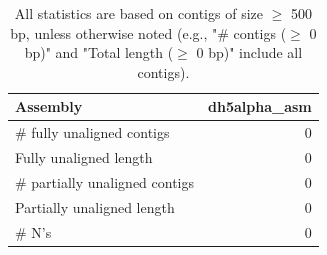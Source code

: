 \documentclass[12pt,a4paper]{article}
\begin{document}
\begin{table}[ht]
\begin{center}
\caption{All statistics are based on contigs of size $\geq$ 500 bp, unless otherwise noted (e.g., "\# contigs ($\geq$ 0 bp)" and "Total length ($\geq$ 0 bp)" include all contigs).}
\begin{tabular}{|l*{1}{|r}|}
\hline
Assembly & dh5alpha\_asm \\ \hline
\# fully unaligned contigs & 0 \\ \hline
Fully unaligned length & 0 \\ \hline
\# partially unaligned contigs & 0 \\ \hline
Partially unaligned length & 0 \\ \hline
\# N's & 0 \\ \hline
\end{tabular}
\end{center}
\end{table}
\end{document}
